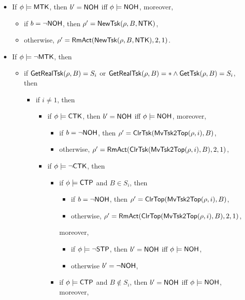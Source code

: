 {\begin{itemize}
\item If $\phi \models {\sf MTK}$,  then $b' = {\sf NOH}$ iff $\phi \models {\sf NOH}$, moreover, 
	\begin{itemize}
		\item if $b = \neg {\sf NOH}$, then $\rho' = \mathsf{NewTsk}(\rho, B, {\sf NTK})$, 
		\item otherwise, $\rho' = \mathsf{RmAct}(\mathsf{NewTsk}(\rho, B, {\sf NTK}), 2, 1)$.
	\end{itemize}
%
\item If $\phi \models \neg {\sf MTK}$,  then
	\begin{itemize}
        \item if $\mathsf{GetRealTsk}(\rho, B) = S_i$ or $\mathsf{GetRealTsk}(\rho,B) = * \wedge\mathsf{GetTsk}(\rho,B) = S_i$, then
        \begin{itemize}
        \item if $i \neq 1$, then 
			\begin{itemize}
				\item if $\phi \models {\sf CTK}$, then $b' = {\sf NOH}$ iff $\phi \models {\sf NOH}$, moreover, 
                \begin{itemize}
					\item if $b = \neg {\sf NOH}$, then $\rho'=\mathsf{ClrTsk}(\mathsf{MvTsk2Top}(\rho, i), B)$,
					\item otherwise, $\rho' = \mathsf{RmAct}(\mathsf{ClrTsk}(\mathsf{MvTsk2Top}(\rho, i), B), 2, 1)$, 
                \end{itemize}
				\item if $\phi \models \neg {\sf CTK}$, then
					\begin{itemize}
						\item if $\phi \models{\sf CTP}$ and $B \in S_i$, then 
						\begin{itemize}
							\item if $b = \neg {\sf NOH}$, then $\rho'=\mathsf{ClrTop}(\mathsf{MvTsk2Top}(\rho, i), B)$,
							\item otherwise, $\rho' = \mathsf{RmAct}(\mathsf{ClrTop}(\mathsf{MvTsk2Top}(\rho, i), B), 2, 1)$, 
						\end{itemize}
						moreover, 
						\begin{itemize}
							\item if $\phi\models \neg {\sf STP}$, then $b' = {\sf NOH}$ iff $\phi \models {\sf NOH}$, 
							\item otherwise $b' = \neg {\sf NOH}$, 
						\end{itemize}
						\item if $\phi \models{\sf CTP}$ and $B \notin S_i$, then $b' = {\sf NOH}$ iff $\phi \models {\sf NOH}$, moreover, 

\end{itemize}
\end{itemize}
\end{itemize}
\end{itemize}
\end{itemize}}
